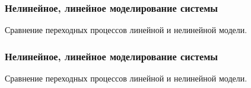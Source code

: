 \documentclass{beamer}
\begin{document}
\begin{frame}[t]
    \frametitle{Нелинейное, линейное моделирование системы}
\begin{center}
    Сравнение переходных процессов линейной и нелинейной модели.
    \vspace{14pt}

        \begin{minipage}{0.49\textwidth}
            \begin{center}
            \resizebox{1.0\textwidth}{!}{}
            \end{center}
        \end{minipage}
        \hfill
        \begin{minipage}{0.49\textwidth}
            \begin{center}
                \resizebox{1.0\textwidth}{!}{}
            \end{center}
        \end{minipage}
\end{center}
\end{frame}


\begin{frame}[t]
    \frametitle{Нелинейное, линейное моделирование системы}
\begin{center}
    Сравнение переходных процессов линейной и нелинейной модели.
    \vspace{14pt}

        \begin{minipage}{0.49\textwidth}
            \begin{center}
            \resizebox{1.0\textwidth}{!}{}
            \end{center}
        \end{minipage}
        \hfill
        \begin{minipage}{0.49\textwidth}
            \begin{center}
                \resizebox{1.0\textwidth}{!}{}
            \end{center}
        \end{minipage}
\end{center}
\end{frame}
\end{document}
